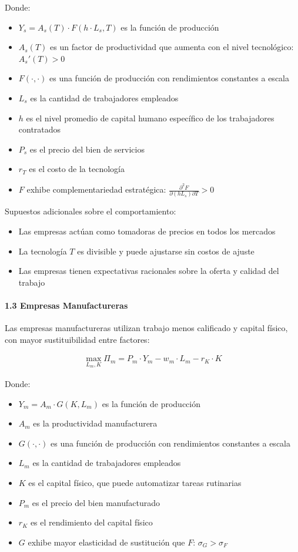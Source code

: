 \documentclass{article}
\theoremstyle{remark}
\theoremstyle{definition}
\begin{document}
\begin{tcolorbox}
Donde:
\begin{itemize}
\item $Y_s = A_s(T) \cdot F(h \cdot L_s, T)$ es la función de producción
\item $A_s(T)$ es un factor de productividad que aumenta con el nivel tecnológico: $A_s'(T) > 0$
\item $F(\cdot,\cdot)$ es una función de producción con rendimientos constantes a escala
\item $L_s$ es la cantidad de trabajadores empleados
\item $h$ es el nivel promedio de capital humano específico de los trabajadores contratados
\item $P_s$ es el precio del bien de servicios
\item $r_T$ es el costo de la tecnología
\item $F$ exhibe complementariedad estratégica: $\frac{\partial^2 F}{\partial (hL_s) \partial T} > 0$
\end{itemize}

Supuestos adicionales sobre el comportamiento:
\begin{itemize}
\item Las empresas actúan como tomadoras de precios en todos los mercados
\item La tecnología $T$ es divisible y puede ajustarse sin costos de ajuste
\item Las empresas tienen expectativas racionales sobre la oferta y calidad del trabajo
\end{itemize}

\paragraph{1.3 Empresas Manufactureras}
Las empresas manufactureras utilizan trabajo menos calificado y capital físico, con mayor sustituibilidad entre factores:

\begin{align}
\max_{L_m,K} \Pi_m = P_m \cdot Y_m - w_m \cdot L_m - r_K \cdot K
\end{align}

Donde:
\begin{itemize}
\item $Y_m = A_m \cdot G(K, L_m)$ es la función de producción
\item $A_m$ es la productividad manufacturera
\item $G(\cdot,\cdot)$ es una función de producción con rendimientos constantes a escala
\item $L_m$ es la cantidad de trabajadores empleados
\item $K$ es el capital físico, que puede automatizar tareas rutinarias
\item $P_m$ es el precio del bien manufacturado
\item $r_K$ es el rendimiento del capital físico
\item $G$ exhibe mayor elasticidad de sustitución que $F$: $\sigma_G > \sigma_F$
\end{itemize}


\end{tcolorbox}
\end{document}
